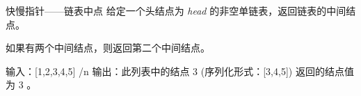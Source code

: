 
\begin{example}{快慢指针——链表中点}
给定一个头结点为 \textsl{head} 的非空单链表，返回链表的中间结点。

如果有两个中间结点，则返回第二个中间结点。

输入：[1,2,3,4,5] /n
输出：此列表中的结点 3 (序列化形式：[3,4,5])
返回的结点值为 3 。
\end{example}